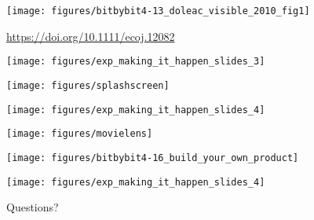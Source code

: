 \documentclass[aspectratio=169]{beamer}
\begin{document}
\begin{frame}

\begin{center}
\texttt{[image: figures/bitbybit4-13\_doleac\_visible\_2010\_fig1]}
\end{center}

\vfill
\url{https://doi.org/10.1111/ecoj.12082}

\end{frame}
\begin{frame}

\begin{center}
\texttt{[image: figures/exp\_making\_it\_happen\_slides\_3]}
\end{center}

\end{frame}
\begin{frame}

\begin{center}
\texttt{[image: figures/splashscreen]}
\end{center}

\end{frame}
\begin{frame}

\begin{center}
\texttt{[image: figures/exp\_making\_it\_happen\_slides\_4]}
\end{center}

\end{frame}
\begin{frame}

\begin{center}
\texttt{[image: figures/movielens]}
\end{center}

\end{frame}
\begin{frame}

\begin{center}
\texttt{[image: figures/bitbybit4-16\_build\_your\_own\_product]}
\end{center}

\end{frame}
\begin{frame}

\begin{center}
\texttt{[image: figures/exp\_making\_it\_happen\_slides\_4]}
\end{center}

\end{frame}
\begin{frame}

\begin{center}
\LARGE Questions?
\end{center}

\end{frame}
\end{document}
